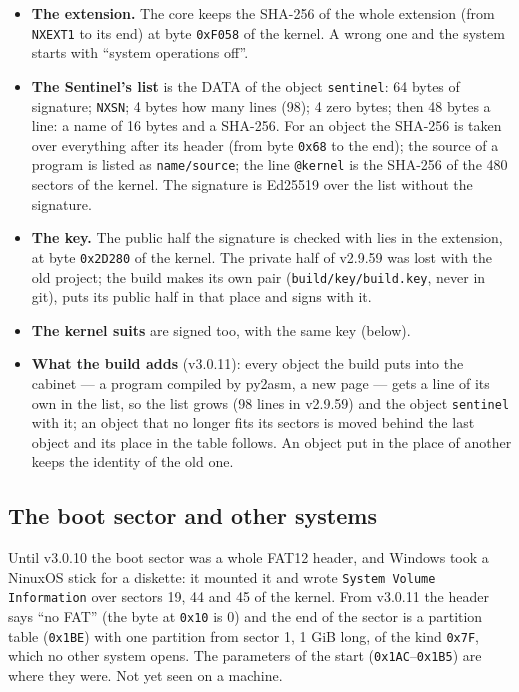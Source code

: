 \documentclass[11pt,a4paper]{article}
\newcommand{\file}[1]{\texttt{#1}}
\begin{document}
\begin{itemize}
\item \textbf{The extension.} The core keeps the SHA-256 of the whole extension (from
      \texttt{NXEXT1} to its end) at byte \texttt{0xF058} of the kernel. A wrong one and the system
      starts with ``system operations off''.
\item \textbf{The Sentinel's list} is the DATA of the object \texttt{sentinel}: 64 bytes of
      signature; \texttt{NXSN}; 4 bytes how many lines (98); 4 zero bytes; then 48 bytes a line: a
      name of 16 bytes and a SHA-256. For an object the SHA-256 is taken over everything after
      its header (from byte \texttt{0x68} to the end); the source of a program is listed as
      \texttt{name/source}; the line \texttt{@kernel} is the SHA-256 of the 480 sectors of the
      kernel. The signature is Ed25519 over the list without the signature.
\item \textbf{The key.} The public half the signature is checked with lies in the extension, at
      byte \texttt{0x2D280} of the kernel. The private half of v2.9.59 was lost with the old
      project; the build makes its own pair (\file{build/key/build.key}, never in git), puts its
      public half in that place and signs with it.
\end{itemize}

\begin{itemize}
\item \textbf{The kernel suits} are signed too, with the same key (below).
\item \textbf{What the build adds} (v3.0.11): every object the build puts into the cabinet ---
      a program compiled by py2asm, a new page --- gets a line of its own in the list, so the
      list grows (98 lines in v2.9.59) and the object \texttt{sentinel} with it; an object that
      no longer fits its sectors is moved behind the last object and its place in the table
      follows. An object put in the place of another keeps the identity of the old one.
\end{itemize}

\subsection{The boot sector and other systems}

Until v3.0.10 the boot sector was a whole FAT12 header, and Windows took a NinuxOS stick for a
diskette: it mounted it and wrote \texttt{System Volume Information} over sectors 19, 44 and 45
of the kernel. From v3.0.11 the header says ``no FAT'' (the byte at \texttt{0x10} is 0) and the
end of the sector is a partition table (\texttt{0x1BE}) with one partition from sector 1, 1 GiB
long, of the kind \texttt{0x7F}, which no other system opens. The parameters of the start
(\texttt{0x1AC}--\texttt{0x1B5}) are where they were. Not yet seen on a machine.
\end{document}
